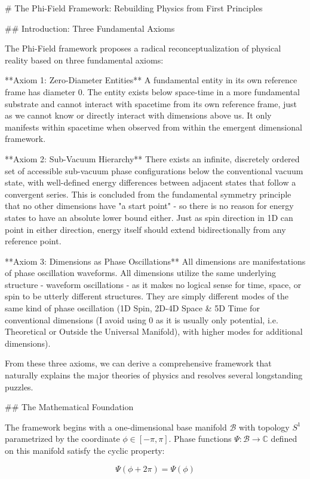 # The Phi-Field Framework: Rebuilding Physics from First Principles

## Introduction: Three Fundamental Axioms

The Phi-Field framework proposes a radical reconceptualization of physical reality based on three fundamental axioms:

**Axiom 1: Zero-Diameter Entities**
A fundamental entity in its own reference frame has diameter 0. The entity exists below space-time in a more fundamental substrate and cannot interact with spacetime from its own reference frame, just as we cannot know or directly interact with dimensions above us. It only manifests within spacetime when observed from within the emergent dimensional framework.

**Axiom 2: Sub-Vacuum Hierarchy**
There exists an infinite, discretely ordered set of accessible sub-vacuum phase configurations below the conventional vacuum state, with well-defined energy differences between adjacent states that follow a convergent series. This is concluded from the fundamental symmetry principle that no other dimensions have "a start point" - so there is no reason for energy states to have an absolute lower bound either. Just as spin direction in 1D can point in either direction, energy itself should extend bidirectionally from any reference point.

**Axiom 3: Dimensions as Phase Oscillations**
All dimensions are manifestations of phase oscillation waveforms. All dimensions utilize the same underlying structure - waveform oscillations - as it makes no logical sense for time, space, or spin to be utterly different structures. They are simply different modes of the same kind of phase oscillation (1D Spin, 2D-4D Space & 5D Time for conventional dimensions (I avoid using 0 as it is usually only potential, i.e. Theoretical or Outside the Universal Manifold), with higher modes for additional dimensions).

From these three axioms, we can derive a comprehensive framework that naturally explains the major theories of physics and resolves several longstanding puzzles.

## The Mathematical Foundation

The framework begins with a one-dimensional base manifold $\mathcal{B}$ with topology $S^1$ parametrized by the coordinate $\phi \in [-\pi, \pi]$. Phase functions $\Psi: \mathcal{B} \rightarrow \mathbb{C}$ defined on this manifold satisfy the cyclic property:

$$\Psi(\phi + 2\pi) = \Psi(\phi)$$

